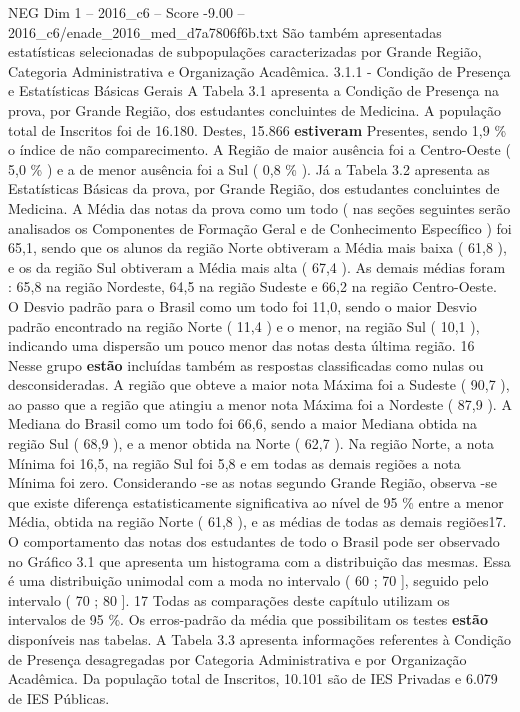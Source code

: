 \begin{textsample}{NEG Dim 1 – 2016\_c6 – Score -9.00 – 2016\_c6/enade\_2016\_med\_d7a7806f6b.txt}
São também apresentadas estatísticas selecionadas de subpopulações caracterizadas por Grande Região, Categoria Administrativa e Organização Acadêmica. 3.1.1 - Condição de Presença e Estatísticas Básicas Gerais A Tabela 3.1 apresenta a Condição de Presença na prova, por Grande Região, dos estudantes concluintes de Medicina.
A população total de Inscritos foi de 16.180.
Destes, 15.866 \textbf{estiveram} Presentes, sendo 1,9 \% o índice de não comparecimento.
A Região de maior ausência foi a Centro-Oeste ( 5,0 \% ) e a de menor ausência foi a Sul ( 0,8 \% ).
Já a Tabela 3.2 apresenta as Estatísticas Básicas da prova, por Grande Região, dos estudantes concluintes de Medicina.
A Média das notas da prova como um todo ( nas seções seguintes serão analisados os Componentes de Formação Geral e de Conhecimento Específico ) foi 65,1, sendo que os alunos da região Norte obtiveram a Média mais baixa ( 61,8 ), e os da região Sul obtiveram a Média mais alta ( 67,4 ).
As demais médias foram : 65,8 na região Nordeste, 64,5 na região Sudeste e 66,2 na região Centro-Oeste.
O Desvio padrão para o Brasil como um todo foi 11,0, sendo o maior Desvio padrão encontrado na região Norte ( 11,4 ) e o menor, na região Sul ( 10,1 ), indicando uma dispersão um pouco menor das notas desta última região. 16 Nesse grupo \textbf{estão} incluídas também as respostas classificadas como nulas ou desconsideradas.
A região que obteve a maior nota Máxima foi a Sudeste ( 90,7 ), ao passo que a região que atingiu a menor nota Máxima foi a Nordeste ( 87,9 ).
A Mediana do Brasil como um todo foi 66,6, sendo a maior Mediana obtida na região Sul ( 68,9 ), e a menor obtida na Norte ( 62,7 ).
Na região Norte, a nota Mínima foi 16,5, na região Sul foi 5,8 e em todas as demais regiões a nota Mínima foi zero.
Considerando -se as notas segundo Grande Região, observa -se que existe diferença estatisticamente significativa ao nível de 95 \% entre a menor Média, obtida na região Norte ( 61,8 ), e as médias de todas as demais regiões17.
O comportamento das notas dos estudantes de todo o Brasil pode ser observado no Gráfico 3.1 que apresenta um histograma com a distribuição das mesmas.
Essa é uma distribuição unimodal com a moda no intervalo ( 60 ; 70 ], seguido pelo intervalo ( 70 ; 80 ]. 17 Todas as comparações deste capítulo utilizam os intervalos de 95 \%.
Os erros-padrão da média que possibilitam os testes \textbf{estão} disponíveis nas tabelas.
A Tabela 3.3 apresenta informações referentes à Condição de Presença desagregadas por Categoria Administrativa e por Organização Acadêmica.
Da população total de Inscritos, 10.101 são de IES Privadas e 6.079 de IES Públicas.

\end{textsample}
